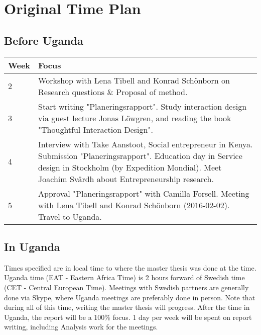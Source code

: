 \section{Original Time Plan}

\subsection{Before Uganda}

\begin{center}
    \begin{tabular}{ | l | p{10cm} |}
    \hline
    Week & Focus \\ \hline
    2 & Workshop with Lena Tibell and Konrad Schönborn on Research questions \& Proposal of method. \\ \hline
    3 & Start writing "Planeringsrapport".
    Study interaction design
    via guest lecture Jonas Löwgren,
    and reading the book "Thoughtful Interaction Design". \\ \hline
    4 & Interview with Take Aanstoot, Social entrepreneur in Kenya. Submission "Planeringsrapport". Education day in Service design in Stockholm (by Expedition Mondial). Meet Joachim Svärdh about Entrepreneurship research. \\ \hline
    5 & Approval "Planeringsrapport" with Camilla Forsell. Meeting with Lena Tibell and Konrad Schönborn (2016-02-02). Travel to Uganda. \\ \hline

    \end{tabular}
\end{center}

\subsection{In Uganda}

Times specified are in local time to where the master thesis was done at the time. Uganda time (EAT - Eastern Africa Time) is 2 hours forward of Swedish time (CET - Central European Time). Meetings with Swedish partners are generally done via Skype, where Uganda meetings are preferably done in person. Note that during all of this time, writing the master thesis will progress. After the time in Uganda, the report will be a 100\% focus. 1 day per week will be spent on report writing, including Analysis work for the meetings.

